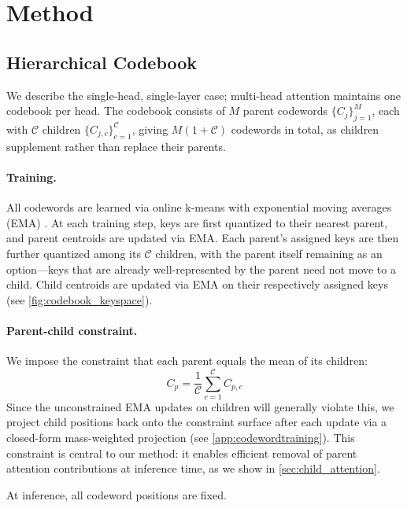 \section{Method}
\label{sec:method}

\subsection{Hierarchical Codebook}

We describe the single-head, single-layer case; multi-head attention maintains one codebook per head. The codebook consists of $M$ parent codewords $\{C_j\}_{j=1}^{M}$, each with $\mathcal{C}$ children $\{C_{j,c}\}_{c=1}^{\mathcal{C}}$, giving $M(1 + \mathcal{C})$ codewords in total, as children supplement rather than replace their parents.

\paragraph{Training.} All codewords are learned via online k-means \cite{lloyd1982least} with exponential moving averages (EMA) \cite{vanoord2017vqvae}. At each training step, keys are first quantized to their nearest parent, and parent centroids are updated via EMA. Each parent's assigned keys are then further quantized among its $\mathcal{C}$ children, with the parent itself remaining as an option---keys that are already well-represented by the parent need not move to a child. Child centroids are updated via EMA on their respectively assigned keys (see \cref{fig:codebook_keyspace}).

\paragraph{Parent-child constraint.} We impose the constraint that each parent equals the mean of its children:
\begin{equation}
\label{eq:parent_constraint}
C_p = \frac{1}{\mathcal{C}}\sum_{c=1}^{\mathcal{C}} C_{p,c}
\end{equation}
Since the unconstrained EMA updates on children will generally violate this, we project child positions back onto the constraint surface after each update via a closed-form mass-weighted projection (see \cref{app:codewordtraining}). This constraint is central to our method: it enables efficient removal of parent attention contributions at inference time, as we show in \cref{sec:child_attention}.

At inference, all codeword positions are fixed.

